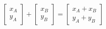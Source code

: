 \documentclass[preview]{standalone}
\begin{document}
\begin{align*}
\begin{bmatrix} x_A \\ y_A \end{bmatrix} + \begin{bmatrix} x_B \\ y_B \end{bmatrix} = \begin{bmatrix} x_A + x_B \\ y_A + y_B \end{bmatrix}
\end{align*}
\end{document}
